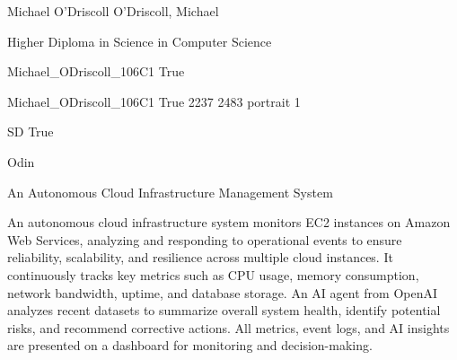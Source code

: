 \documentclass[twoside]{report}
\begin{document}
\begingroup{}\relax



\def\Key{Michael_ODriscoll_106C1}

{Michael O'Driscoll}
{O'Driscoll, Michael}

{Higher Diploma in Science in Computer Science}

{Michael_ODriscoll_106C1}
{True}

{Michael_ODriscoll_106C1}
{True}
{2237}
{2483}
{portrait}
{1}

{SD}
{True}

{Odin}

{An Autonomous Cloud Infrastructure Management System}

{An autonomous cloud infrastructure system monitors EC2 instances on Amazon Web Services, analyzing and responding to operational events to ensure reliability, scalability, and resilience across multiple cloud instances. It continuously tracks key metrics such as CPU usage, memory consumption, network bandwidth, uptime, and database storage. An AI agent from OpenAI analyzes recent datasets to summarize overall system health, identify potential risks, and recommend corrective actions. All metrics, event logs, and AI insights are presented on a dashboard for monitoring and decision-making.}
\end{document}
